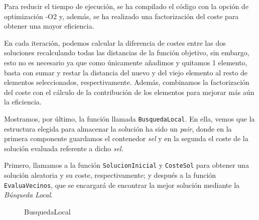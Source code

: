 \begin{enumerate}
	
	Para reducir el tiempo de ejecución, se ha compilado el código con la opción de optimización -O2 y, además, se ha realizado una factorización del coste para obtener una mayor eficiencia.
	
	En cada iteración, podemos calcular la diferencia de costes entre las dos soluciones recalculando todas las distancias de la función objetivo, sin embargo, esto no es necesario ya que como únicamente añadimos y quitamos 1 elemento, basta con sumar y restar la distancia del nuevo y del viejo elemento al resto de elementos seleccionados, respectivamente. Además, combinamos la factorización del coste con el cálculo de la contribución de los elementos para mejorar más aún la eficiencia.
	
	
	
	
	
	
	
	\newpage
	
	Mostramos, por último, la función llamada \texttt{BusquedaLocal}. En ella, vemos que la estructura elegida para almacenar la solución ha sido un \textit{pair}, donde en la primera componente guardamos el contenedor \textit{sel} y en la segunda el coste de la solución evaluada referente a dicho \textit{sel}.
	
	Primero, llamamos a la función \texttt{SolucionInicial} y \texttt{CosteSol} para obtener una solución aleatoria y su coste, respectivamente; y después a la función \texttt{EvaluaVecinos}, que se encargará de encontrar la mejor solución mediante la \textit{Búsqueda Local}.
	
	\begin{figure}[H]
		\centering
		\begin{minipage}{.7\linewidth}
			
			
	\begin{algorithm}[H] 
		\caption{BusquedaLocal}
		\SetAlgoLined
		
		
		
		
	\end{algorithm}
	\end{minipage}
\end{figure}
	
	
	
\end{enumerate}








